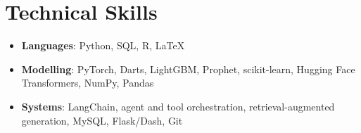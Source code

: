 \documentclass[a4paper,11pt]{article}
\newcommand{\resumeItemListStart}{\begin{itemize}[leftmargin=*,itemsep=1pt,topsep=2pt]}
\newcommand{\resumeItemListEnd}{\end{itemize}\vspace{-8pt}}
\begin{document}
\section{Technical Skills}
 \resumeItemListStart
   \item \textbf{Languages}: Python, SQL, R, \LaTeX
   \item \textbf{Modelling}: PyTorch, Darts, LightGBM, Prophet, scikit-learn,
   Hugging Face Transformers, NumPy, Pandas
   \item \textbf{Systems}: LangChain, agent and tool orchestration,
   retrieval-augmented generation, MySQL, Flask/Dash, Git
 \resumeItemListEnd

\end{document}
